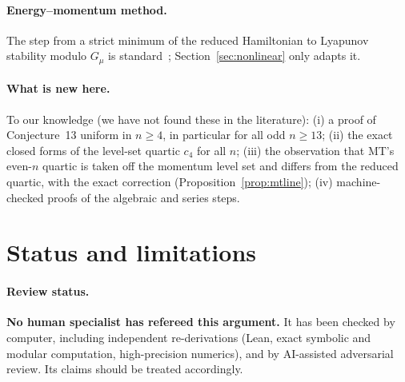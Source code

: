 \documentclass[11pt]{article}
\numberwithin{equation}{section}
\theoremstyle{definition}
\theoremstyle{remark}
\begin{document}
\paragraph{Energy--momentum method.} The step from a strict minimum of the reduced Hamiltonian to Lyapunov
stability modulo $G_\mu$ is standard~\cite{Patrick92,OR99,OR04,PRW,Montaldi97}; Section~\ref{sec:nonlinear}
only adapts it.

\paragraph{What is new here.} To our knowledge (we have not found these in the literature):
(i) a proof of Conjecture~13 uniform in $n\ge4$, in particular for all odd $n\ge13$; (ii) the exact closed forms
of the level-set quartic $c_4$ for all $n$; (iii) the observation that MT's even-$n$ quartic is taken off the
momentum level set and differs from the reduced quartic, with the exact correction
(Proposition~\ref{prop:mtline}); (iv) machine-checked proofs of the algebraic and series steps.

\section{Status and limitations}\label{sec:status}

\paragraph{Review status.} \textbf{No human specialist has refereed this argument.} It has been
checked by computer, including independent re-derivations (Lean, exact symbolic and modular computation,
high-precision numerics), and by AI-assisted adversarial review. Its claims should be treated
accordingly.
\end{document}
